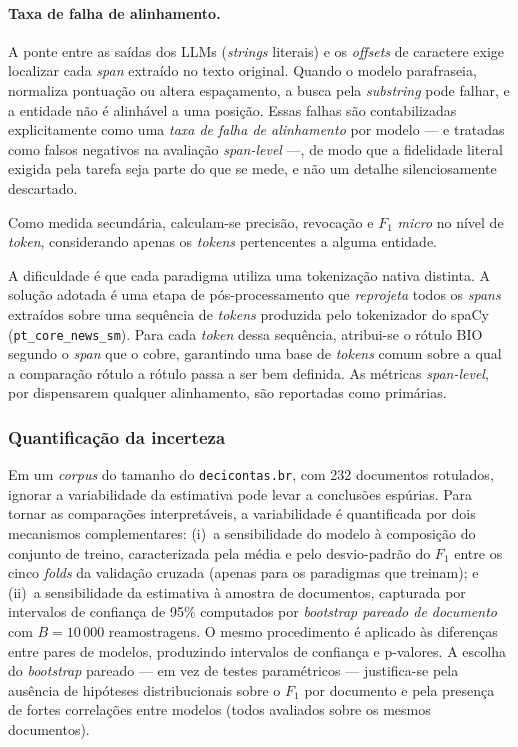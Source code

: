 \paragraph{Taxa de falha de alinhamento.} A ponte entre as saídas dos LLMs (\textit{strings} literais) e os \textit{offsets} de caractere exige localizar cada \textit{span} extraído no texto original. Quando o modelo parafraseia, normaliza pontuação ou altera espaçamento, a busca pela \textit{substring} pode falhar, e a entidade não é alinhável a uma posição. Essas falhas são contabilizadas explicitamente como uma \emph{taxa de falha de alinhamento} por modelo --- e tratadas como falsos negativos na avaliação \textit{span-level} ---, de modo que a fidelidade literal exigida pela tarefa seja parte do que se mede, e não um detalhe silenciosamente descartado.

Como medida secundária, calculam-se precisão, revocação e $F_1$ \textit{micro} no nível de \textit{token}, considerando apenas os \textit{tokens} pertencentes a alguma entidade. 

A dificuldade é que cada paradigma utiliza uma tokenização nativa distinta. A solução adotada é uma etapa de pós-processamento que \emph{reprojeta} todos os \textit{spans} extraídos sobre uma sequência de \textit{tokens} produzida pelo tokenizador do spaCy (\texttt{pt\_core\_news\_sm}). Para cada \textit{token} dessa sequência, atribui-se o rótulo BIO segundo o \textit{span} que o cobre, garantindo uma base de \textit{tokens} comum sobre a qual a comparação rótulo a rótulo passa a ser bem definida. As métricas \textit{span-level}, por dispensarem qualquer alinhamento, são reportadas como primárias.

\subsubsection{Quantificação da incerteza}

Em um \textit{corpus} do tamanho do \texttt{decicontas.br}, com 232 documentos rotulados, ignorar a variabilidade da estimativa pode levar a conclusões espúrias. Para tornar as comparações interpretáveis, a variabilidade é quantificada por dois mecanismos complementares: (i)~a sensibilidade do modelo à composição do conjunto de treino, caracterizada pela média e pelo desvio-padrão do $F_1$ entre os cinco \textit{folds} da validação cruzada (apenas para os paradigmas que treinam); e (ii)~a sensibilidade da estimativa à amostra de documentos, capturada por intervalos de confiança de 95\% computados por \emph{bootstrap pareado de documento} com $B = 10\,000$ reamostragens. O mesmo procedimento é aplicado às diferenças entre pares de modelos, produzindo intervalos de confiança e p-valores. A escolha do \textit{bootstrap} pareado --- em vez de testes paramétricos --- justifica-se pela ausência de hipóteses distribucionais sobre o $F_1$ por documento e pela presença de fortes correlações entre modelos (todos avaliados sobre os mesmos documentos).

